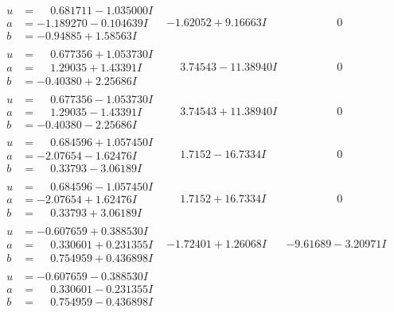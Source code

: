 \documentclass[1p]{elsarticle_modified}
\theoremstyle{definition}
\begin{document}
$$\begin{array}{c|c|c}
\begin{aligned}
u &= \phantom{-}0.681711 - 1.035000 I \\
a &= -1.189270 - 0.104639 I \\
b &= -0.94885 + 1.58563 I\end{aligned}
 & -1.62052 + 9.16663 I & \phantom{-0.000000 } 0 \\ \hline\begin{aligned}
u &= \phantom{-}0.677356 + 1.053730 I \\
a &= \phantom{-}1.29035 + 1.43391 I \\
b &= -0.40380 + 2.25686 I\end{aligned}
 & \phantom{-}3.74543 - 11.38940 I & \phantom{-0.000000 } 0 \\ \hline\begin{aligned}
u &= \phantom{-}0.677356 - 1.053730 I \\
a &= \phantom{-}1.29035 - 1.43391 I \\
b &= -0.40380 - 2.25686 I\end{aligned}
 & \phantom{-}3.74543 + 11.38940 I & \phantom{-0.000000 } 0 \\ \hline\begin{aligned}
u &= \phantom{-}0.684596 + 1.057450 I \\
a &= -2.07654 - 1.62476 I \\
b &= \phantom{-}0.33793 - 3.06189 I\end{aligned}
 & \phantom{-}1.7152 - 16.7334 I & \phantom{-0.000000 } 0 \\ \hline\begin{aligned}
u &= \phantom{-}0.684596 - 1.057450 I \\
a &= -2.07654 + 1.62476 I \\
b &= \phantom{-}0.33793 + 3.06189 I\end{aligned}
 & \phantom{-}1.7152 + 16.7334 I & \phantom{-0.000000 } 0 \\ \hline\begin{aligned}
u &= -0.607659 + 0.388530 I \\
a &= \phantom{-}0.330601 + 0.231355 I \\
b &= \phantom{-}0.754959 + 0.436898 I\end{aligned}
 & -1.72401 + 1.26068 I & -9.61689 - 3.20971 I \\ \hline\begin{aligned}
u &= -0.607659 - 0.388530 I \\
a &= \phantom{-}0.330601 - 0.231355 I \\
b &= \phantom{-}0.754959 - 0.436898 I\end{aligned}

\end{array}$$
\end{document}
